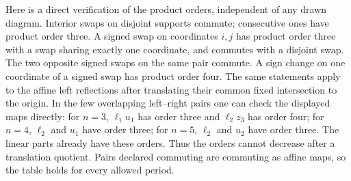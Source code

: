 Here is a direct verification of the product orders, independent of
any drawn diagram. Interior swaps on disjoint supports commute;
consecutive ones have product order three. A signed swap on
coordinates $i,j$ has product order three with a swap sharing
exactly one coordinate, and commutes with a disjoint swap. The
two opposite signed swaps on the same pair commute. A sign change
on one coordinate of a signed swap has product order four.
The same statements apply to the affine left reflections after
translating their common fixed intersection to the origin. In the
few overlapping left--right pairs one can check the displayed
maps directly: for $n=3$, $\ell_1u_1$ has order three and
$\ell_2z_3$ has order four;
for $n=4$, $\ell_2$ and $u_1$ have order three; for $n=5$,
$\ell_2$ and $u_2$ have order three. The linear parts already
have these orders. Thus the orders cannot decrease after a
translation quotient. Pairs declared commuting are commuting
as affine maps, so the table holds for every allowed period.

